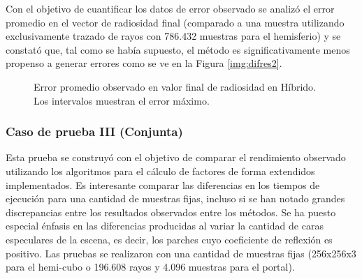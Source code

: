 Con el objetivo de cuantificar los datos de error observado se analizó el error promedio en el vector de radiosidad final (comparado a una muestra utilizando exclusivamente trazado de rayos con 786.432 muestras para el hemisferio) y se constató que, tal como se había supuesto, el método es significativamente menos propenso a generar errores como se ve en la Figura \ref{img:difres2}.

\begin{figure}[htbp!]
\caption{Error promedio observado en valor final de radiosidad en Híbrido. Los intervalos muestran el error máximo.}
\label{plot:errorcII}
\end{figure}

\subsubsection{Caso de prueba III (Conjunta)}

Esta prueba se construyó con el objetivo de comparar el rendimiento observado utilizando los algoritmos para el cálculo de factores de forma extendidos implementados. Es interesante comparar las diferencias en los tiempos de ejecución para una cantidad de muestras fijas, incluso si se han notado grandes discrepancias entre los resultados observados entre los métodos. Se ha puesto especial énfasis en las diferencias producidas al variar la cantidad de caras especulares de la escena, es decir, los parches cuyo coeficiente de reflexión es positivo. Las pruebas se realizaron con una cantidad de muestras fijas (256x256x3 para el hemi-cubo o 196.608 rayos y 4.096 muestras para el portal).

